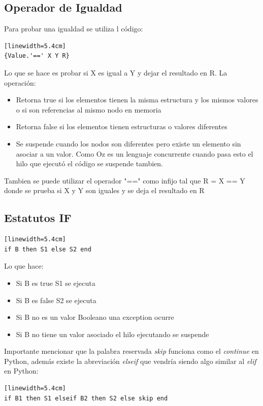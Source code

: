 \documentclass[10pt,journal,compsoc]{IEEEtran}
\begin{document}
\subsection{Operador de Igualdad}
Para probar una igualdad se utiliza l c\'odigo:
\begin{lstlisting}[language=Oz, caption = {Variables en un scope}][linewidth=5.4cm]
{Value.'==' X Y R}
\end{lstlisting}
Lo que se hace es probar si X es igual a Y y dejar el resultado en R. La operaci\'on:
\begin{itemize}
	\item Retorna true si los elementos tienen la misma estructura y los mismos valores o si son referencias al mismo nodo en memoria
	\item Retorna false si los elementos tienen estructuras o valores diferentes
	\item Se suspende cuando los nodos son diferentes pero existe un elemento sin asociar a un valor. Como Oz es un lenguaje concurrente cuando pasa esto el hilo que ejecut\'o el c\'odigo se suspende tambien.
\end{itemize}
Tambien se puede utilizar el operador  "==" como infijo tal que R = X == Y donde se prueba si X y Y son iguales y se deja el resultado en R

\subsection{Estatutos IF}
\begin{lstlisting}[language=Oz, caption = {Variables en un scope}][linewidth=5.4cm]
if B then S1 else S2 end
\end{lstlisting}
Lo que hace:
\begin{itemize}
	\item Si B es true S1 se ejecuta
	\item Si B es false S2 se ejecuta
	\item Si B no es un valor Booleano una exception ocurre
	\item Si B no tiene un valor asociado el hilo ejecutando se suspende 
\end{itemize}
Importante mencionar que la palabra reservada \emph{skip} funciona como el \emph{continue} en Python, adem\'as existe la abreviaci\'on \emph{elseif} que vendr\'ia siendo algo similar al \emph{elif} en Python:
\begin{lstlisting}[language=Oz, caption = {Variables en un scope}][linewidth=5.4cm]
if B1 then S1 elseif B2 then S2 else skip end
\end{lstlisting}
\end{document}
